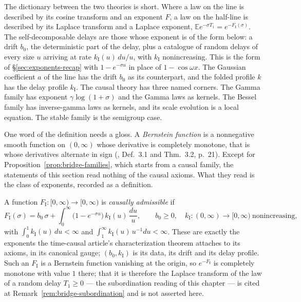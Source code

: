 The dictionary between the two theories is short. Where a law on the line is described by its
cosine transform and an exponent $F$, a law on the half-line is described by its Laplace
transform and a Laplace exponent, $\mathbb{E}e^{-\sigma T_1} = e^{-F_{\mathrm I}(\sigma)}$. The
self-decomposable delays are those whose exponent is of the form below: a drift $b_0$, the
deterministic part of the delay, plus a catalogue of random delays of every size $u$ arriving
at rate $k_{\mathrm I}(u)\,du/u$, with $k_{\mathrm I}$ nonincreasing. This is the form of
\S\ref{sec:exponents-recap} with $1 - e^{-\sigma u}$ in place of $1 - \cos\omega x$. The
Gaussian coefficient $a$ of the line has the drift $b_0$ as its counterpart, and the folded
profile $k$ has the delay profile $k_{\mathrm I}$. The causal theory has three named corners.
The Gamma family has exponent $\gamma\log(1 + \sigma)$ and the Gamma laws as kernels. The
Bessel family has inverse-gamma laws as kernels, and its scale evolution is a local equation.
The stable family is the semigroup case.

One word of the definition needs a gloss. A \emph{Bernstein function} is a nonnegative smooth
function on $(0,\infty)$ whose derivative is completely monotone, that is whose derivatives
alternate in sign (, Def.~3.1 and Thm.~3.2, p.~21). Except for
Proposition~\ref{prop:bridge-families}, which starts from a causal family, the statements of
this section read nothing of the causal axioms. What they read is the class of exponents,
recorded as a definition.

\begin{definition}\label{def:causal-admissible}
A function $F_{\mathrm I} : [0,\infty) \to [0,\infty)$ is \emph{causally admissible} if
\[
  F_{\mathrm I}(\sigma) = b_0\,\sigma
   + \int_0^\infty \bigl(1 - e^{-\sigma u}\bigr)\,k_{\mathrm I}(u)\,\frac{du}{u},
  \qquad b_0 \ge 0, \quad k_{\mathrm I} : (0,\infty) \to [0,\infty) \ \text{nonincreasing},
\]
with $\int_0^1 k_{\mathrm I}(u)\,du < \infty$ and
$\int_1^\infty k_{\mathrm I}(u)\,u^{-1}du < \infty$. These are exactly the exponents the
time-causal article's characterization theorem attaches to its axioms, in its canonical gauge;
$(b_0, k_{\mathrm I})$ is its data, its drift and its delay profile. Such an
$F_{\mathrm I}$ is a Bernstein function vanishing at the origin, so $e^{-F_{\mathrm I}}$ is
completely monotone with value $1$ there; that it is therefore the Laplace transform of the law
of a random delay $T_1 \ge 0$ --- the subordination reading of this chapter --- is cited at
Remark~\ref{rem:bridge-subordination} and is not asserted here.
\end{definition}

